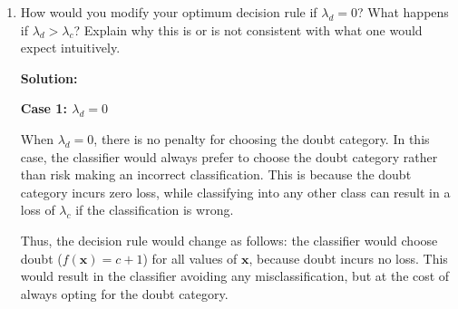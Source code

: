 \documentclass{article}
\newenvironment{solution}{\color{blue} \smallskip \textbf{Solution:}}{}
\begin{document}
\begin{enumerate}
\begin{solution}
Scenario 1:\(P(Y = i \mid \mathbf{x}) \geq 1 - \frac{\lambda_d}{\lambda_c}\) for some class \(i\). According to rule R2, \(f_{\text{opt}}(x)\) will choose class \(i\). If \(f'(x)\) chooses a different class \(j \neq i\), then the expected loss would increase since class \(i\) has the highest probability, and class \(j\) has a lower posterior probability. Hence, \(f'(x)\) cannot minimize the risk better than \(f_{\text{opt}}(x)\) in this case.

Scenario 2: \(P(Y = i \mid \mathbf{x}) < 1 - \frac{\lambda_d}{\lambda_c}\) for all classes \(i\). In this case, \(f_{\text{opt}}(x)\) chooses the doubt class, which incurs the loss \(\lambda_d\). If \(f'(x)\) chooses a class \(i\) instead of doubt, the risk would be higher because choosing any class when the posterior probability is low results in a higher expected loss (\(\lambda_c\)). Therefore, \(f'(x)\) also cannot minimize the risk better than \(f_{\text{opt}}(x)\) in this scenario.\\


We have shown that in both scenarios, any other policy \(f'(x)\) would result in a higher risk compared to \(f_{\text{opt}}(x)\). Therefore, the optimal policy \(f_{\text{opt}}(x)\) indeed minimizes the risk.


\end{solution}

\newpage
\item How would you modify your optimum decision rule if $\lambda_d=0$?  What happens if $\lambda_d>\lambda_c$? Explain why this is or is not consistent with what one would expect intuitively.

\begin{solution}


\textbf{Case 1: \(\lambda_d = 0\)}

When \(\lambda_d = 0\), there is no penalty for choosing the doubt category. In this case, the classifier would always prefer to choose the doubt category rather than risk making an incorrect classification. This is because the doubt category incurs zero loss, while classifying into any other class can result in a loss of \(\lambda_c\) if the classification is wrong.

Thus, the decision rule would change as follows: the classifier would choose doubt (\(f(\mathbf{x}) = c+1\)) for all values of \(\mathbf{x}\), because doubt incurs no loss. This would result in the classifier avoiding any misclassification, but at the cost of always opting for the doubt category.


\end{solution}
\end{enumerate}
\end{document}
